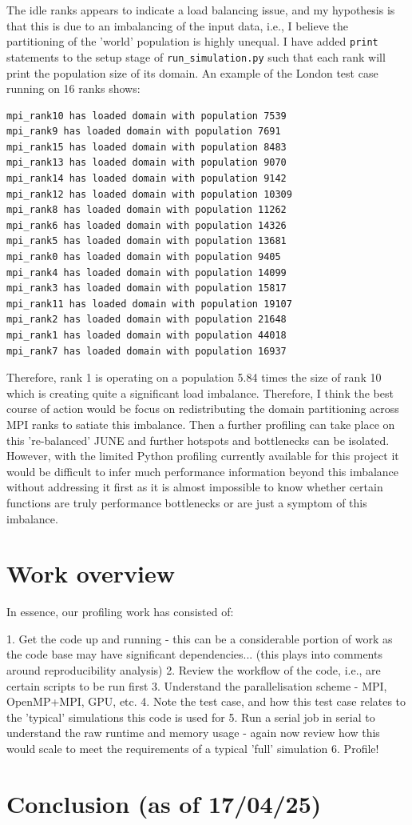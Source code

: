 The idle ranks appears to indicate a load balancing issue, and my hypothesis is
that this is due to an imbalancing of the input data, i.e., I believe the
partitioning of the 'world' population is highly unequal. I have added \verb|print|
statements to the setup stage of \verb|run_simulation.py| such that each rank will
print the population size of its domain. An example of the London test case
running on 16 ranks shows:
\begin{verbatim}
mpi_rank10 has loaded domain with population 7539
mpi_rank9 has loaded domain with population 7691
mpi_rank15 has loaded domain with population 8483
mpi_rank13 has loaded domain with population 9070
mpi_rank14 has loaded domain with population 9142
mpi_rank12 has loaded domain with population 10309
mpi_rank8 has loaded domain with population 11262
mpi_rank6 has loaded domain with population 14326
mpi_rank5 has loaded domain with population 13681
mpi_rank0 has loaded domain with population 9405
mpi_rank4 has loaded domain with population 14099
mpi_rank3 has loaded domain with population 15817
mpi_rank11 has loaded domain with population 19107
mpi_rank2 has loaded domain with population 21648
mpi_rank1 has loaded domain with population 44018
mpi_rank7 has loaded domain with population 16937
\end{verbatim}
Therefore, rank 1 is operating on a population 5.84 times the size of rank 10
which is creating quite a significant load imbalance. Therefore, I think the
best course of action would be focus on redistributing the domain partitioning
across MPI ranks to satiate this imbalance. Then a further profiling can take
place on this 're-balanced' JUNE and further hotspots and bottlenecks can be
isolated. However, with the limited Python profiling currently available for
this project it would be difficult to infer much performance information beyond
this imbalance without addressing it first as it is almost impossible to know
whether certain functions are truly performance bottlenecks or are just a
symptom of this imbalance.

\section{Work overview}
In essence, our profiling work has consisted of:

1. Get the code up and running - this can be a considerable portion of work as
   the code base may have significant dependencies... (this plays into comments
around reproducibility analysis)
2. Review the workflow of the code, i.e., are certain scripts to be run first
3. Understand the parallelisation scheme - MPI, OpenMP+MPI, GPU, etc.
4. Note the test case, and how this test case relates to the 'typical'
   simulations this code is used for
5. Run a serial job in serial to understand the raw runtime and memory usage -
   again now review how this would scale to meet the requirements of a typical
'full' simulation
6. Profile!

\section{Conclusion (as of 17/04/25)}